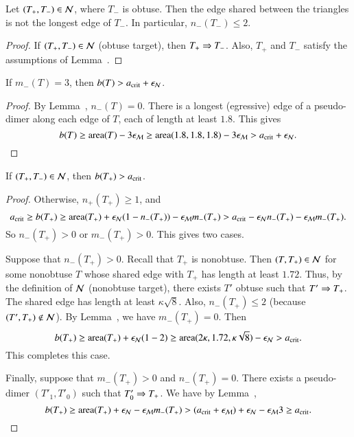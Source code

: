 \begin{corollary} 
  Let $(T_+,T_-)\in\mathcal N$, where $T_-$ is obtuse.  Then the edge shared
  between the triangles is not the longest edge of $T_-$.  In
  particular, $n_-(T_-)\le 2$.
\end{corollary}

\begin{proof} If $(T_+,T_-)\in \mathcal N$ (obtuse target), then $T_+\Rightarrow T_-$.
  Also, $T_+$ and $T_-$ satisfy the assumptions of
  Lemma~.
\end{proof}

\begin{lemma} 
If $m_-(T) = 3$, then $b(T) > a_\text{crit} + \epsilon_{\mathcal N}$.
\end{lemma}

\begin{proof} By Lemma~, $n_-(T)=0$.  There is a
  longest (egressive) edge of a pseudo-dimer along each edge of $T$,
  each of length at least $1.8$.  This gives
\[
b(T) \ge {\operatorname{area}}(T) - 3\epsilon_{\mathcal M} 
\ge {\operatorname{area}}(1.8,1.8,1.8) - 3\epsilon_{\mathcal M} > a_\text{crit} + \epsilon_{\mathcal N}.
\]
\end{proof}

\begin{lemma}  
  If $(T_+,T_-)\in \mathcal N$, then $b(T_+)>a_\text{crit}$.
\end{lemma}

\begin{proof}  Otherwise, $n_+(T_+)\ge 1$, and
\[
a_\text{crit} \ge b(T_+) 
\ge {\operatorname{area}}(T_+) + \epsilon_{\mathcal N} (1 - n_-(T_+)) - \epsilon_{\mathcal M} m_-(T_+)
> a_\text{crit} - \epsilon_{\mathcal N} n_-(T_+) - \epsilon_{\mathcal M} m_-(T_+).
\]
So $n_-(T_+) > 0$ or $m_-(T_+)>0$. This gives two cases.  

Suppose that $n_-(T_+) >0$.  Recall that $T_+$ is nonobtuse.  Then
$(T,T_+)\in\mathcal N$ for some nonobtuse $T$ whose shared edge with $T_+$ has
length at least $1.72$.  Thus, by the definition of $\mathcal N$ (nonobtuse
target), there exists $T'$ obtuse such that $T'\Rightarrow T_+$.  The shared
edge has length at least $\kappa\sqrt8$.  Also, $n_-(T_+)\le 2$
(because $(T',T_+)\not\in \mathcal N$).  By Lemma~, we have
$m_-(T_+)=0$.  Then
\[
b(T_+) \ge {\operatorname{area}}(T_+) + \epsilon_{\mathcal N} (1 - 2) 
\ge {\operatorname{area}} (2\kappa,1.72,\kappa\sqrt8) - \epsilon_{\mathcal N} > a_\text{crit}.
\]
This completes this case.

Finally, suppose that $m_-(T_+)>0$ and $n_-(T_+)=0$.  There exists a
pseudo-dimer $(T'_1,T'_0)$ such that $T'_0\Rightarrow T_+$.  We have
by Lemma~,
\[
b(T_+) \ge {\operatorname{area}}(T_+)+\epsilon_{\mathcal N} - \epsilon_{\mathcal M} m_-(T_+) 
> (a_\text{crit} + \epsilon_{\mathcal M}) + \epsilon_{\mathcal N} -\epsilon_{\mathcal M}  3 \ge a_\text{crit}.
\]
\end{proof}



